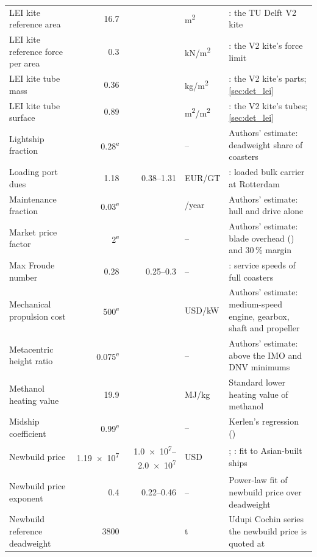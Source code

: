 \begin{longtable}{@{}>{\raggedright\arraybackslash}p{3.4cm}rr>{\raggedright\arraybackslash}p{1.4cm}>{\raggedright\arraybackslash}p{5.8cm}@{}}
LEI kite reference area & \num{16.7} &  & m\textsuperscript{2} & \citet[p. 405]{vandervlugt2013}: the TU Delft V2 kite \\
LEI kite reference force per area & \num{0.3} &  & kN/m\textsuperscript{2} & \citet[p. 409]{vandervlugt2013}: the V2 kite's force limit \\
LEI kite tube mass & \num{0.36} &  & kg/m\textsuperscript{2} & \citet[Table 2-1]{schwoll2012}: the V2 kite's parts; \cref{sec:det_lei} \\
LEI kite tube surface & \num{0.89} &  & m\textsuperscript{2}/m\textsuperscript{2} & \citet[p. 21]{schwoll2012}: the V2 kite's tubes; \cref{sec:det_lei} \\
Lightship fraction & \num{0.28}\textsuperscript{e} &  & -- & Authors' estimate: deadweight share of coasters \\
Loading port dues & \num{1.18} & \num{0.38}--\num{1.31} & EUR/GT & \citet[Annex 1]{portofrotterdam2026tariffs}: loaded bulk carrier at Rotterdam \\
Maintenance fraction & \num{0.03}\textsuperscript{e} &  & 1/year & Authors' estimate: hull and drive alone \\
Market price factor & \num{2}\textsuperscript{e} &  & -- & Authors' estimate: blade overhead (\citealp{bortolotti2019blade}) and 30\,\% margin \\
Max Froude number & \num{0.28} & \num{0.25}--\num{0.3} & -- & \citet{man2011}: service speeds of full coasters \\
Mechanical propulsion cost & \num{500}\textsuperscript{e} &  & USD/kW & Authors' estimate: medium-speed engine, gearbox, shaft and propeller \\
Metacentric height ratio & \num{0.075}\textsuperscript{e} &  & -- & Authors' estimate: above the IMO and DNV minimums \\
Methanol heating value & \num{19.9} &  & MJ/kg & Standard lower heating value of methanol \\
Midship coefficient & \num{0.99}\textsuperscript{e} &  & -- & Kerlen's regression (\citealp{ventura_estimation}) \\
Newbuild price & \num{1.19e7} & \num{1.0e7}--\num{2.0e7} & USD & \citet{onmanorama2023udupi}; \citet{shipuniverse2026kobc}: fit to Asian-built ships \\
Newbuild price exponent & \num{0.4} & \num{0.22}--\num{0.46} & -- & Power-law fit of newbuild price over deadweight \\
Newbuild reference deadweight & \num{3800} &  & t & Udupi Cochin series the newbuild price is quoted at \\

\end{longtable}
